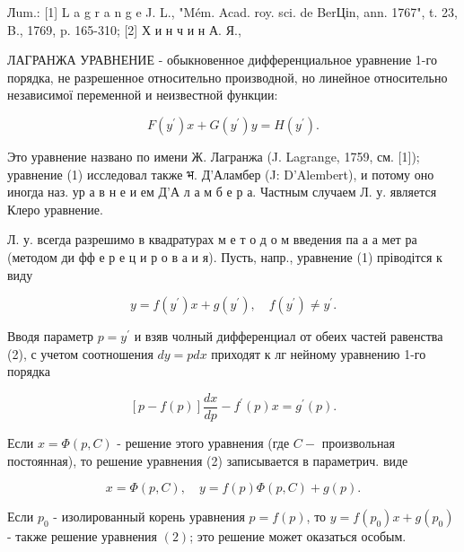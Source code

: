 \documentclass[10pt]{article}
\begin{document}
Лum.: [1] L a g r a n g e J. L., "Mém. Acad. roy. sci. de BerЦіn, ann. 1767", t. 23, B., 1769, p. 165-310; [2] Х и н ч и н А. Я.,



ЛАГРАНЖА УРАВНЕНИЕ - обыкновенное дифференциальное уравнение 1-го порядка, не разрешенное относительно производной, но линейное относительно независимої переменной и неизвестной функции:



\[

F\left(y^{\prime}\right) x+G\left(y^{\prime}\right) y=H\left(y^{\prime}\right) .

\]



Это уравнение названо по имени Ж. Лагранжа (J. Lagrange, 1759, см. [1]); уравнение (1) исследовал также भ. Д'Аламбер (J: D'Alembert), и потому оно иногда наз. ур а в н е и ем Д'А л а м б е р а. Частным случаем Л. у. является Клеро уравнение.



Л. у. всегда разрешимо в квадратурах м е т о д о м введения па а а мет ра (методом ди фф е р е ц и р о в а и я). Пусть, напр., уравнение (1) пріводітся к виду



\[

y=f\left(y^{\prime}\right) x+g\left(y^{\prime}\right), \quad f\left(y^{\prime}\right) \neq y^{\prime} .

\]



Вводя параметр $p=y^{\prime}$ и взяв чолный дифференциал от обеих частей равенства (2), с учетом соотношения $d y=p d x$ приходят к лг нейному уравнению 1-го порядка



\[

[p-f(p)] \frac{d x}{d p}-f^{\prime}(p) x=g^{\prime}(p) .

\]



Если $x=\Phi(p, C)$ - решение этого уравнения (где $C-$ произвольная постоянная), то решение уравнения (2) записывается в параметрич. виде



\[

x=\Phi(p, C), \quad y=f(p) \Phi(p, C)+g(p) .

\]



Если $p_{0}$ - изолированный корень уравнения $p=f(p)$, то $y=f\left(p_{0}\right) x+g\left(p_{0}\right)$ - также решение уравнения $(2)$; это решение может оказаться особым.
\end{document}
